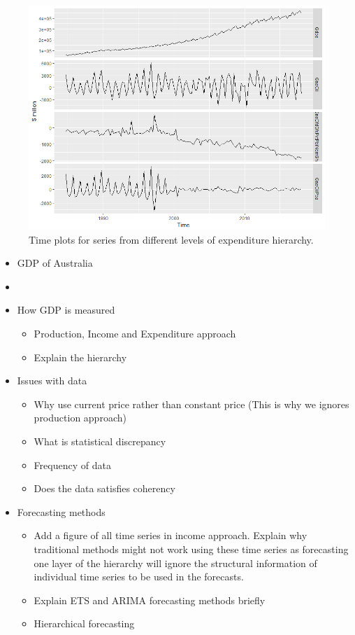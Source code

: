 \documentclass[graybox]{svmult}
\begin{document}
\begin{figure}[H]
	\centering
	\small
	\includegraphics[width=\textwidth]{Figs/TS-plots/EXP-hierarchy/EXP-char-of-levels-TSplots.png}
	\caption{Time plots for series from different levels of expenditure hierarchy.}\label{fig:TS-Exp}
\end{figure}


\clearpage	


\begin{itemize}
	\item GDP of Australia
	\item []
	\item How GDP is measured
	\begin{itemize}
		\item Production, Income and Expenditure approach
		\item Explain the hierarchy
	\end{itemize}
	\item Issues with data
	\begin{itemize}
		\item Why use current price rather than constant price (This is why we ignores production approach)
		\item What is statistical discrepancy
		\item Frequency of data
		\item Does the data satisfies coherency
	\end{itemize}
	
	\item Forecasting methods
	\begin{itemize}
		\item Add a figure of all time series in income approach.
		Explain why traditional methods might not work using these time series as forecasting one layer of the hierarchy will ignore the structural information of individual time series to be used in the forecasts.
		
		\item Explain ETS and ARIMA forecasting methods briefly
		\item Hierarchical forecasting
	\end{itemize}
\end{itemize}
\end{document}
